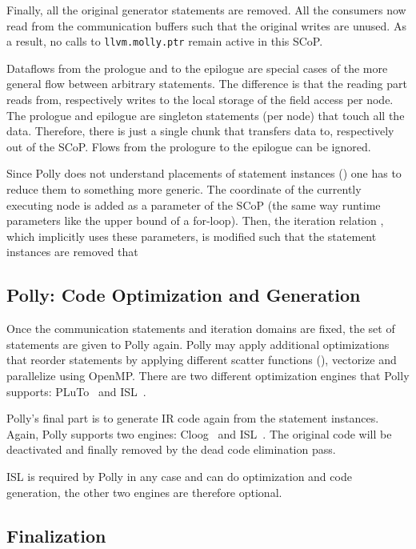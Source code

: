 \documentclass{sigplanconf}
\begin{document}
Finally, all the original generator statements are removed. All the consumers now read from the communication buffers such that the original writes are unused. As a result, no calls to \texttt{llvm.molly.ptr} remain active in this SCoP.


Dataflows from the prologue and to the epilogue are special cases of the more general flow between arbitrary statements. The difference is that the reading part reads from, respectively writes to the local storage of the field access per node. The prologue and epilogue are singleton statements (per node) that touch all the data. Therefore, there is just a single chunk that transfers data to, respectively out of the SCoP. Flows from the prologure to the epilogue can be ignored.



Since Polly does not understand placements of statement instances () one has to reduce them to something more generic. The coordinate of the currently executing node is added as a parameter of the SCoP (the same way runtime parameters like the upper bound of a for-loop). Then, the iteration relation , which implicitly uses these parameters, is modified such that the statement instances are removed that 






\subsection{Polly: Code Optimization and Generation}

Once the communication statements and iteration domains are fixed, the set of statements are given to Polly again. Polly may apply additional optimizations that reorder statements by applying different scatter functions (), vectorize and parallelize using OpenMP. There are two different optimization engines that Polly supports: PLuTo~\cite{pluto} and ISL~\cite{isl}.

Polly's final part is to generate IR code again from the statement instances. Again, Polly supports two engines: Cloog~\cite{cloog} and ISL~\cite{isl}.  The original code will be deactivated and finally removed by the dead code elimination pass.

ISL is required by Polly in any case and can do optimization and code generation, the other two engines are therefore optional.


\subsection{Finalization}
\end{document}
